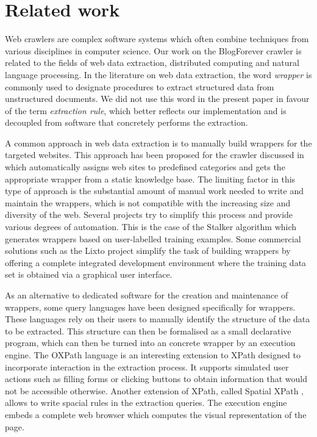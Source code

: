 \section{Related work}
\label{relatedwork}

Web crawlers are complex software systems which often combine techniques 
from various disciplines in computer science. Our work on the BlogForever 
crawler is related to the fields of web data extraction, distributed 
computing and natural language processing. In the literature on web 
data extraction, the word \emph{wrapper} is commonly used to designate 
procedures to extract structured data from unstructured documents. 
We did not use this word in the present paper in favour of the term 
\emph{extraction rule}, which better reflects our implementation and 
is decoupled from software that concretely performs the extraction.

A common approach in web data extraction is to manually build wrappers 
for the targeted websites. This approach has been proposed for the 
crawler discussed in \cite{faheem2012intelligent} which automatically 
assigns web sites to predefined categories and gets the appropriate 
wrapper from a static knowledge base. The limiting factor in this type 
of approach is the substantial amount of manual work needed to write and 
maintain the wrappers, which is not compatible with the increasing size 
and diversity of the web. Several projects try to simplify this process 
and provide various degrees of automation. This is the case of the 
Stalker algorithm \cite{stalker} which generates wrappers based on 
user-labelled training examples. Some commercial solutions such as 
the Lixto project \cite{lixto} simplify the task of building wrappers 
by offering a complete integrated development environment where the 
training data set is obtained via a graphical user interface.

As an alternative to dedicated software for the creation and maintenance 
of wrappers, some query languages have been designed specifically for 
wrappers. These languages rely on their users to manually identify 
the structure of the data to be extracted. This structure can then 
be formalised as a small declarative program, which can then be turned
into an concrete wrapper by an execution engine. The OXPath language 
\cite{oxpath2013} is an interesting extension to XPath designed to 
incorporate interaction in the extraction process. It supports simulated
user actions such as filling forms or clicking buttons to obtain 
information that would not be accessible otherwise. Another extension of 
XPath, called Spatial XPath \cite{sxpath2010}, allows to write spacial 
rules in the extraction queries. The execution engine embeds a complete 
web browser which computes the visual representation of the page.

